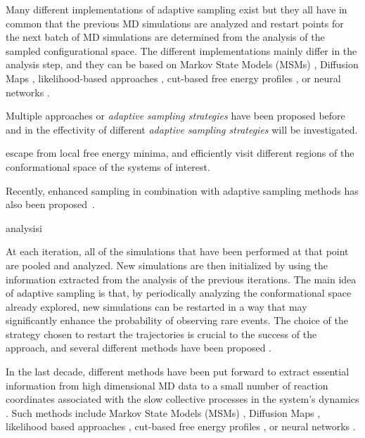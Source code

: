 Many different implementations of adaptive sampling exist but they all 
have in common
that the previous MD simulations are analyzed and restart points for the next
batch of MD simulations are determined from the analysis of the sampled configurational space.
The different implementations mainly differ in the analysis step, and
they can be based on Markov State Models (MSMs) \cite{prinz2011markov,
MSM-Pande-2018,bookmsm,masterequationsMSM,SCHUTTE1999146}, Diffusion Maps
\cite{Coifman7426, rohrdanz2011determination,Zheng2011, Boninsegna2015},
likelihood-based approaches \cite{peters2006obtaining}, cut-based free energy
profiles \cite{krivov2008diffusive}, or neural networks
\cite{Mardt2018,wehmeyer2018time, ribeiro2018reweighted}. 


Multiple approaches or \emph{adaptive sampling strategies} have been proposed before \cite{singhal2005error, bowman2010enhanced,
weber2011characterization, Fabritiis-2014, preto2014fast, doerr2016htmd,
AdaptivePELE-Lecina2017, EvolutionCoupling-Shamsi2017, FAST-Bowman-2015, 
Strategies-erros-reduce, plattner2017complete} and in the effectivity of different \emph{adaptive sampling strategies} will be investigated. 


escape from local free energy minima, and efficiently visit different regions of
the conformational space of the systems of interest.


Recently, enhanced sampling in combination with adaptive sampling methods has
also been proposed~\cite{pathreweight5}.







analysisi

At each iteration, all of the simulations that have been performed at that
point are pooled and analyzed. New simulations are then initialized by
using the information extracted from the analysis of the previous iterations.
The main idea of adaptive sampling is that, by periodically analyzing the
conformational space already explored, new simulations can be restarted 
in a way that may significantly enhance the probability of observing rare
events. The choice of the strategy chosen to restart the trajectories is crucial
to the success of the approach, and several different methods have been
proposed \cite{weber2011characterization, Fabritiis-2014,
AdaptivePELE-Lecina2017,preto2014fast, doerr2016htmd,roblitz2013fuzzy,
weexplore, WESTPA-Zwier2015}.

 In the last decade, different methods have been
put forward to extract essential information from high dimensional MD data to a
small number of reaction coordinates associated with the slow
collective processes in the system's dynamics \cite{rohrdanz2013discovering,
noe2017collective}. Such methods include Markov State Models (MSMs) \cite{prinz2011markov,
MSM-Pande-2018,bookmsm,masterequationsMSM,SCHUTTE1999146}, Diffusion Maps
\cite{Coifman7426, rohrdanz2011determination,Zheng2011, Boninsegna2015}, likelihood based approaches
\cite{peters2006obtaining}, cut-based free energy profiles
\cite{krivov2008diffusive}, or neural networks \cite{Mardt2018,wehmeyer2018time,
ribeiro2018reweighted}.  

